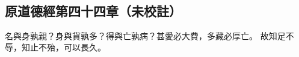 ﻿%
%

\chapter{~}

\section{原道德經第四十四章（未校註）}

\begin{withgezhu}

\zhsong


名與身孰親？身與貨孰多？得與亡孰病？甚愛必大費，多藏必厚亡。
故知足不辱，知止不殆，可以長久。

\end{withgezhu}

